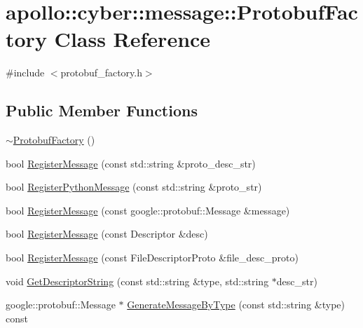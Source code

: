 \hypertarget{classapollo_1_1cyber_1_1message_1_1ProtobufFactory}{\section{apollo\-:\-:cyber\-:\-:message\-:\-:Protobuf\-Factory Class Reference}
\label{classapollo_1_1cyber_1_1message_1_1ProtobufFactory}
}


{\ttfamily \#include $<$protobuf\-\_\-factory.\-h$>$}

\subsection*{Public Member Functions}
\begin{DoxyCompactItemize}
\item 
\hyperlink{classapollo_1_1cyber_1_1message_1_1ProtobufFactory_a3fab943f6f9d2c5d7bc14aea1e1bb02f}{$\sim$\-Protobuf\-Factory} ()
\item 
bool \hyperlink{classapollo_1_1cyber_1_1message_1_1ProtobufFactory_a28e6888421ed69854760067707251132}{Register\-Message} (const std\-::string \&proto\-\_\-desc\-\_\-str)
\item 
bool \hyperlink{classapollo_1_1cyber_1_1message_1_1ProtobufFactory_a7447830ef927a587f5a61e43db290116}{Register\-Python\-Message} (const std\-::string \&proto\-\_\-str)
\item 
bool \hyperlink{classapollo_1_1cyber_1_1message_1_1ProtobufFactory_a9c66829001d077097204caa85a256f35}{Register\-Message} (const google\-::protobuf\-::\-Message \&message)
\item 
bool \hyperlink{classapollo_1_1cyber_1_1message_1_1ProtobufFactory_a812fef889296b4c1c16adf73bb0c37d3}{Register\-Message} (const Descriptor \&desc)
\item 
bool \hyperlink{classapollo_1_1cyber_1_1message_1_1ProtobufFactory_a9a496ef71145954a1a473bc6443c294d}{Register\-Message} (const File\-Descriptor\-Proto \&file\-\_\-desc\-\_\-proto)
\item 
void \hyperlink{classapollo_1_1cyber_1_1message_1_1ProtobufFactory_a36b7f4ba5945f4c89d157a51bc8539fd}{Get\-Descriptor\-String} (const std\-::string \&type, std\-::string $\ast$desc\-\_\-str)
\item 
google\-::protobuf\-::\-Message $\ast$ \hyperlink{classapollo_1_1cyber_1_1message_1_1ProtobufFactory_a07a04ac066aa60627656b90f49d07daa}{Generate\-Message\-By\-Type} (const std\-::string \&type) const 

\end{DoxyCompactItemize}
